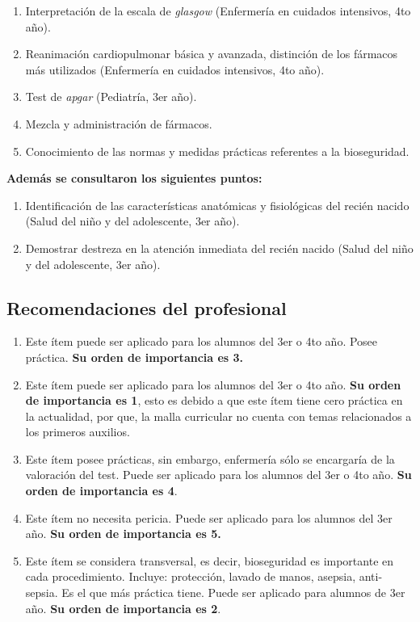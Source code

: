 \begin{enumerate}
\def\labelenumi{\arabic{enumi}.}
\itemsep1pt\parskip0pt
\item
  Interpretación de la escala de \emph{glasgow} (Enfermería en cuidados
  intensivos, 4to año).
\item
  Reanimación cardiopulmonar básica y avanzada, distinción de los
  fármacos más utilizados (Enfermería en cuidados intensivos, 4to año).
\item
  Test de \emph{apgar} (Pediatría, 3er año).
\item
  Mezcla y administración de fármacos.
\item
  Conocimiento de las normas y medidas prácticas referentes a la
  bioseguridad.
\end{enumerate}

\textbf{Además se consultaron los siguientes puntos:}

\begin{enumerate}
\def\labelenumi{\arabic{enumi}.}
\itemsep1pt\parskip0pt
\item
  Identificación de las características anatómicas y fisiológicas del
  recién nacido (Salud del niño y del adolescente, 3er año).
\item
  Demostrar destreza en la atención inmediata del recién nacido (Salud
  del niño y del adolescente, 3er año).
\end{enumerate}

\subsection{Recomendaciones del
profesional}\label{recomendaciones-del-profesional}

\begin{enumerate}
\def\labelenumi{\arabic{enumi}.}
\itemsep1pt\parskip0pt
\item
  Este ítem puede ser aplicado para los alumnos del 3er o 4to año. Posee
  práctica. \textbf{Su orden de importancia es 3.}
\item
  Este ítem puede ser aplicado para los alumnos del 3er o 4to año.
  \textbf{Su orden de importancia es 1}, esto es debido a que este ítem
  tiene cero práctica en la actualidad, por que, la malla curricular no
  cuenta con temas relacionados a los primeros auxilios.
\item
  Este ítem posee prácticas, sin embargo, enfermería sólo se encargaría
  de la valoración del test. Puede ser aplicado para los alumnos del 3er
  o 4to año. \textbf{Su orden de importancia es 4}.
\item
  Este ítem no necesita pericia. Puede ser aplicado para los alumnos del
  3er año. \textbf{Su orden de importancia es 5.}
\item
  Este ítem se considera transversal, es decir, bioseguridad es
  importante en cada procedimiento. Incluye: protección, lavado de
  manos, asepsia, anti-sepsia. Es el que más práctica tiene. Puede ser
  aplicado para alumnos de 3er año. \textbf{Su orden de importancia es
  2}.
\end{enumerate}

